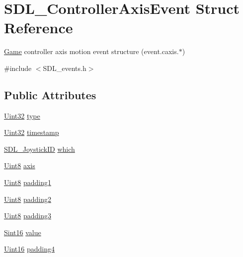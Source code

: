 \hypertarget{struct_s_d_l___controller_axis_event}{}\section{S\+D\+L\+\_\+\+Controller\+Axis\+Event Struct Reference}
\label{struct_s_d_l___controller_axis_event}


\mbox{\hyperlink{class_game}{Game}} controller axis motion event structure (event.\+caxis.$\ast$)  




{\ttfamily \#include $<$S\+D\+L\+\_\+events.\+h$>$}

\subsection*{Public Attributes}
\begin{DoxyCompactItemize}
\item 
\mbox{\hyperlink{_s_d_l__stdinc_8h_add440eff171ea5f55cb00c4a9ab8672d}{Uint32}} \mbox{\hyperlink{struct_s_d_l___controller_axis_event_aa904b61e4763d28d887cf8afcc3cbb7c}{type}}
\item 
\mbox{\hyperlink{_s_d_l__stdinc_8h_add440eff171ea5f55cb00c4a9ab8672d}{Uint32}} \mbox{\hyperlink{struct_s_d_l___controller_axis_event_afc92dba0b4d1652a1ecf9e85606d1f14}{timestamp}}
\item 
\mbox{\hyperlink{_s_d_l__joystick_8h_a3c3d32500cb08f76ee8077983912c0bd}{S\+D\+L\+\_\+\+Joystick\+ID}} \mbox{\hyperlink{struct_s_d_l___controller_axis_event_a07087f68ea9d64b50047d65312ee7b94}{which}}
\item 
\mbox{\hyperlink{_s_d_l__stdinc_8h_a2944638813a090aa23e62f4da842c3e2}{Uint8}} \mbox{\hyperlink{struct_s_d_l___controller_axis_event_aba6543c143521aebce06a41a8cf79db0}{axis}}
\item 
\mbox{\hyperlink{_s_d_l__stdinc_8h_a2944638813a090aa23e62f4da842c3e2}{Uint8}} \mbox{\hyperlink{struct_s_d_l___controller_axis_event_af980495b1e24f9a868f2ccb25ce9629b}{padding1}}
\item 
\mbox{\hyperlink{_s_d_l__stdinc_8h_a2944638813a090aa23e62f4da842c3e2}{Uint8}} \mbox{\hyperlink{struct_s_d_l___controller_axis_event_a4a04fcd20a54db21c5258ab0e40c6ab5}{padding2}}
\item 
\mbox{\hyperlink{_s_d_l__stdinc_8h_a2944638813a090aa23e62f4da842c3e2}{Uint8}} \mbox{\hyperlink{struct_s_d_l___controller_axis_event_ab82598fe5621dca9b1a41f7b2ca1e9a0}{padding3}}
\item 
\mbox{\hyperlink{_s_d_l__stdinc_8h_a9d0257032c0e146ab6121bf0122712f5}{Sint16}} \mbox{\hyperlink{struct_s_d_l___controller_axis_event_a1ed7f14255ed01b982d40a38791d475a}{value}}
\item 
\mbox{\hyperlink{_s_d_l__stdinc_8h_a31fcc0a076c9068668173ee26d33e42b}{Uint16}} \mbox{\hyperlink{struct_s_d_l___controller_axis_event_ae0ad0f279b9978bbbac9f5b22ae8020b}{padding4}}
\end{DoxyCompactItemize}


